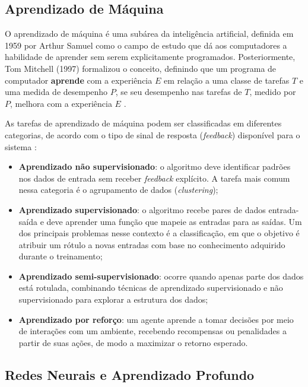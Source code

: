 \documentclass[12pt]{article}
\begin{document}
\subsection{Aprendizado de Máquina}
\label{sec:review:machine_learning}

O aprendizado de máquina é uma subárea da inteligência artificial, definida em 1959 por Arthur Samuel como o campo de estudo que dá aos computadores a habilidade de aprender sem serem explicitamente programados. Posteriormente, Tom Mitchell (1997) formalizou o conceito, definindo que um programa de computador \textbf{aprende} com a experiência $E$ em relação a uma classe de tarefas $T$ e uma medida de desempenho $P$, se seu desempenho nas tarefas de $T$, medido por $P$, melhora com a experiência $E$ \cite{mitchell1997machine}.

As tarefas de aprendizado de máquina podem ser classificadas em diferentes categorias, de acordo com o tipo de sinal de resposta (\textit{feedback}) disponível para o sistema \cite{russell2010artificial}:

\begin{itemize}
    \item \textbf{Aprendizado não supervisionado}: o algoritmo deve identificar padrões nos dados de entrada sem receber \emph{feedback} explícito. A tarefa mais comum nessa categoria é o agrupamento de dados (\textit{clustering});
    
    \item \textbf{Aprendizado supervisionado}: o algoritmo recebe pares de dados entrada-saída e deve aprender uma função que mapeie as entradas para as saídas. Um dos principais problemas nesse contexto é a classificação, em que o objetivo é atribuir um rótulo a novas entradas com base no conhecimento adquirido durante o treinamento;
    
    \item \textbf{Aprendizado semi-supervisionado}: ocorre quando apenas parte dos dados está rotulada, combinando técnicas de aprendizado supervisionado e não supervisionado para explorar a estrutura dos dados;
    
    \item \textbf{Aprendizado por reforço}: um agente aprende a tomar decisões por meio de interações com um ambiente, recebendo recompensas ou penalidades a partir de suas ações, de modo a maximizar o retorno esperado.
\end{itemize}

\subsection{Redes Neurais e Aprendizado Profundo}
\label{sec:review:deep_learning}
\end{document}
